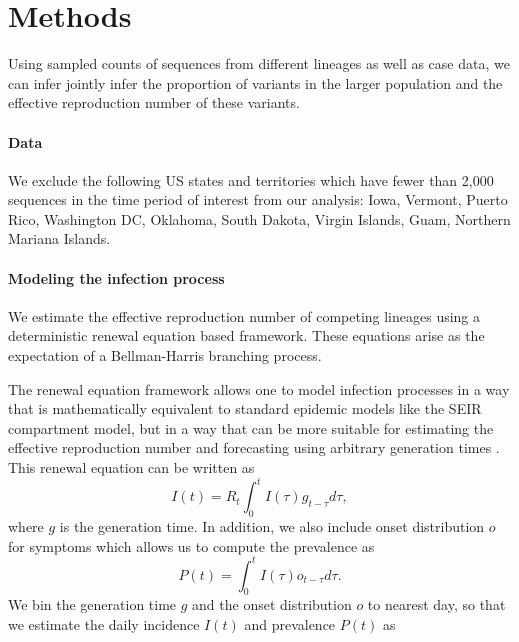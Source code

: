 \documentclass[12pt]{article}
\begin{document}


\section{Methods}

Using sampled counts of sequences from different lineages as well as case data, we can infer jointly infer the proportion of variants in the larger population and the effective reproduction number of these variants.

\paragraph{Data}

We exclude the following US states and territories which have fewer than 2,000 sequences in the time period of interest from our analysis: Iowa, Vermont, Puerto Rico, Washington DC, Oklahoma, South Dakota, Virgin Islands, Guam, Northern Mariana Islands.

\paragraph{Modeling the infection process}%

We estimate the effective reproduction number of competing lineages using a deterministic renewal equation based framework. These equations arise as the expectation of a Bellman-Harris branching process. \cite{Bellman1948}

The renewal equation framework allows one to model infection processes in a way that is mathematically equivalent to standard epidemic models like the SEIR compartment model, but in a way that can be more suitable for estimating the effective reproduction number and forecasting using arbitrary generation times \cite{Champredon2018}. This renewal equation can be written as
\begin{equation}
  I(t) = R_{t} \int_{0}^{t} I(\tau)g_{t-\tau} d\tau,
\end{equation}
where $g$ is the generation time.
In addition, we also include onset distribution $o$ for symptoms which allows us to compute the prevalence as
\begin{equation}
  P(t) = \int_{0}^{t} I(\tau) o_{t-\tau} d \tau.
\end{equation}
We bin the generation time $g$ and the onset distribution $o$ to nearest day, so that we estimate the daily incidence $I(t)$ and prevalence $P(t)$ as
\end{document}

